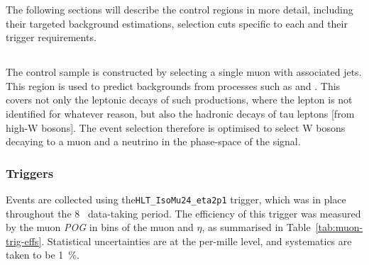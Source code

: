 The following sections will describe the control regions in more detail,
including their targeted background estimations, selection cuts specific to each
and their trigger requirements.

\subsection{\mj}
\label{sec:mujets_control_sample}

The \mj control sample is constructed by selecting a single muon with associated 
jets. This region is used to predict backgrounds from processes such as \wj and
\ttj. This covers not only the leptonic decays of such productions, where the 
lepton is not identified for whatever reason, but also the hadronic decays of tau 
leptons [from high-\Pt W bosons]. The event selection therefore is optimised to 
select W bosons decaying to a muon and a neutrino in the phase-space of the 
signal.

\subsubsection{Triggers}
\label{sec:mujets_control_trigger}
Events are collected using the\verb!HLT_IsoMu24_eta2p1! trigger, which was in
place throughout the 8~\tev
data-taking period. The efficiency of this trigger was measured by the muon
\emph{POG} in bins of the muon \Pt and $\eta$, as summarised 
in Table~\ref{tab:muon-trig-effs}. Statistical uncertainties are at the
per-mille level, and systematics are taken to be 1~\%.

